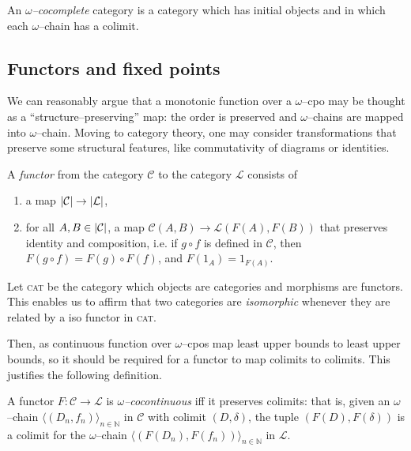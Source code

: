 \begin{dfn}
  An \emph{\(\omega\)--cocomplete} category is a category which has initial objects and in which each \(\omega\)--chain has a colimit. %
\end{dfn}

\subsection{Functors and fixed points}

We can reasonably argue that a monotonic function over a \(\omega\)--cpo may be thought as a ``structure--preserving'' map: the order is preserved and \(\omega\)--chains are mapped into \(\omega\)--chain. %
Moving to category theory, one may consider transformations that preserve some structural features, like commutativity of diagrams or identities.

\begin{dfn}
  A \emph{functor} from the category \(\mathcal{C}\) to the category \(\mathcal{L}\) consists of
  \begin{enumerate}
    \item a map \(\lvert \mathcal{C} \rvert \to \lvert \mathcal{L} \rvert\),
    \item for all \(A, B \in \lvert \mathcal{C} \rvert\), a map \(\mathcal{C}(A,B) \to \mathcal{L}(F(A),F(B))\) that preserves identity and composition, i.e.
      if \(g \circ f\) is defined in \(\mathcal{C}\), then
            \(F(g \circ f) = F(g) \circ F(f)\), and
            \(F(1_A) = 1_{F(A)}\).
  \end{enumerate}
\end{dfn}

\begin{rem}
  Let \textsc{cat} be the category which objects are categories and morphisms are functors. This enables us to affirm that two categories are \emph{isomorphic} whenever they are related by a iso functor in \textsc{cat}.
\end{rem}

Then, as continuous function over \(\omega\)--cpos map least upper bounds to least upper bounds, so it should be required for a functor to map colimits to colimits. This justifies the following definition. %

\begin{dfn}
  A functor \(F \colon \mathcal{C} \to \mathcal{L}\) is \emph{\(\omega\)--cocontinuous} iff it preserves colimits: that is, given an \(\omega\)--chain \({\langle (D_n,f_n) \rangle}_{n \in \mathbb{N}}\) in \(\mathcal{C}\) with colimit \((D,\delta)\), the tuple \((F(D),F(\delta))\) is a colimit for the \(\omega\)--chain \({\langle (F(D_n),F(f_n))\rangle}_{n \in \mathbb{N}}\) in \(\mathcal{L}\). %
\end{dfn}

